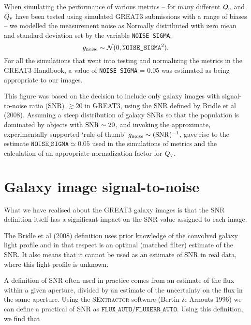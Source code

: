 \documentclass[preprint,11pt]{aastex}
\begin{document}
When simulating the performance of various metrics -- for many different
$Q_{\rm c}$ and $Q_{\rm v}$ have been tested using simulated GREAT3
submissions with a range of biases -- we modelled the measurement
noise as Normally distributed with zero mean and standard deviation
set by the variable \texttt{NOISE\_SIGMA}:
\begin{equation}
g_{\rm noise} \sim \mathcal{N}(0, \texttt{NOISE\_SIGMA}^2).
\end{equation}
For all the simulations that went into testing and normalizing the
metrics in the GREAT3 Handbook, a value of \texttt{NOISE\_SIGMA} =
0.05 was estimated as being appropriate to our images.

This figure was based on the decision to include only galaxy images
with signal-to-noise ratio (SNR) $\gtrsim 20$ in GREAT3, using the SNR
defined by Bridle et al (2008).  Assuming a steep distribution of
galaxy SNRs so that the population is dominated by objects with ${\rm
  SNR} \sim 20$, and invoking the approximate, experimentally
supported `rule of thumb' $g_{\rm noise} \sim ({\rm SNR})^{-1}$, gave
rise to the estimate $\texttt{NOISE\_SIGMA} \simeq 0.05$ used in the
simulations of metrics and the calculation of an appropriate
normalization factor for $Q_{\rm v}$.

\section{Galaxy image signal-to-noise}\label{sec:snr}
What we have realised about the GREAT3 galaxy images is that the SNR
definition itself has a significant impact on the SNR value assigned
to each image.

The Bridle et al (2008) definition uses prior knowledge of the
convolved galaxy light profile and in that respect is an optimal
(matched filter) estimate of the SNR.  It also means that it cannot be
used as an estimate of SNR in real data, where this light profile is
unknown.

A definition of SNR often used in practice comes from an estimate of
the flux within a given aperture, divided by an estimate of the
uncertainty on the flux in the same aperture.  Using the
\textsc{SExtractor} software (Bertin \& Arnouts 1996) we can define a
practical of SNR as $\texttt{FLUX\_AUTO} / \texttt{FLUXERR\_AUTO}$.
Using this definition, we find that
\end{document}

